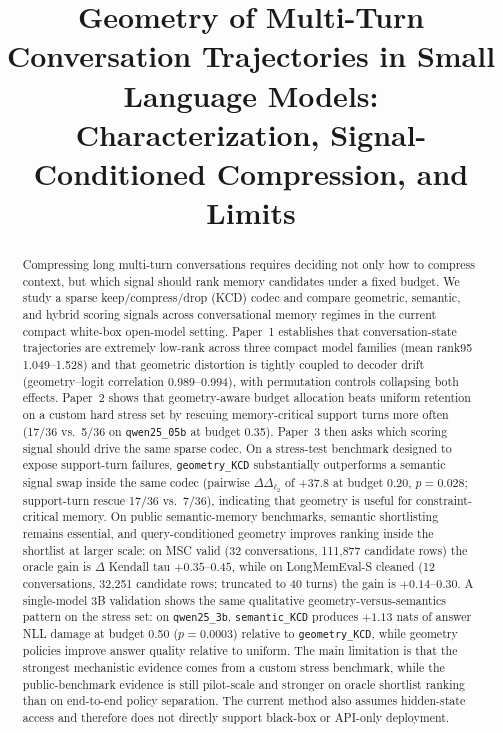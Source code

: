 \documentclass[conference]{IEEEtran}
\title{Geometry of Multi-Turn Conversation Trajectories in Small Language Models:\\
Characterization, Signal-Conditioned Compression, and Limits}
\author{
\IEEEauthorblockN{Pranav Kompally}
\IEEEauthorblockA{
Independent Research Checkpoint\\
New York, USA\\
\texttt{rt-geometry-memory repository checkpoint}
}
}
\newcommand{\Logit}{\Delta_{\ell_2}}
\begin{document}
\maketitle

\begin{abstract}
Compressing long multi-turn conversations requires deciding not only how to compress context, but which signal should rank memory candidates under a fixed budget. We study a sparse keep/compress/drop (KCD) codec and compare geometric, semantic, and hybrid scoring signals across conversational memory regimes in the current compact white-box open-model setting. Paper~1 establishes that conversation-state trajectories are extremely low-rank across three compact model families (mean rank95 1.049--1.528) and that geometric distortion is tightly coupled to decoder drift (geometry--logit correlation 0.989--0.994), with permutation controls collapsing both effects. Paper~2 shows that geometry-aware budget allocation beats uniform retention on a custom hard stress set by rescuing memory-critical support turns more often (17/36 vs.\ 5/36 on \texttt{qwen25\_05b} at budget 0.35). Paper~3 then asks which scoring signal should drive the same sparse codec. On a stress-test benchmark designed to expose support-turn failures, \texttt{geometry\_KCD} substantially outperforms a semantic signal swap inside the same codec (pairwise $\Delta\Logit$ of +37.8 at budget 0.20, $p=0.028$; support-turn rescue 17/36 vs.\ 7/36), indicating that geometry is useful for constraint-critical memory. On public semantic-memory benchmarks, semantic shortlisting remains essential, and query-conditioned geometry improves ranking inside the shortlist at larger scale: on MSC valid (32 conversations, 111{,}877 candidate rows) the oracle gain is $\Delta$ Kendall tau $+0.35$--$0.45$, while on LongMemEval-S cleaned (12 conversations, 32{,}251 candidate rows; truncated to 40 turns) the gain is $+0.14$--$0.30$. A single-model 3B validation shows the same qualitative geometry-versus-semantics pattern on the stress set: on \texttt{qwen25\_3b}, \texttt{semantic\_KCD} produces $+1.13$ nats of answer NLL damage at budget 0.50 ($p=0.0003$) relative to \texttt{geometry\_KCD}, while geometry policies improve answer quality relative to uniform. The main limitation is that the strongest mechanistic evidence comes from a custom stress benchmark, while the public-benchmark evidence is still pilot-scale and stronger on oracle shortlist ranking than on end-to-end policy separation. The current method also assumes hidden-state access and therefore does not directly support black-box or API-only deployment.
\end{abstract}
\end{document}
